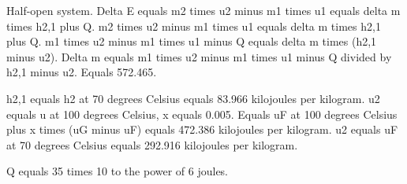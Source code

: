 Half-open system.  
Delta E equals m2 times u2 minus m1 times u1 equals delta m times h2,1 plus Q.  
m2 times u2 minus m1 times u1 equals delta m times h2,1 plus Q.  
m1 times u2 minus m1 times u1 minus Q equals delta m times (h2,1 minus u2).  
Delta m equals m1 times u2 minus m1 times u1 minus Q divided by h2,1 minus u2.  
Equals 572.465.  

h2,1 equals h2 at 70 degrees Celsius equals 83.966 kilojoules per kilogram.  
u2 equals u at 100 degrees Celsius, x equals 0.005.  
Equals uF at 100 degrees Celsius plus x times (uG minus uF) equals 472.386 kilojoules per kilogram.  
u2 equals uF at 70 degrees Celsius equals 292.916 kilojoules per kilogram.  

Q equals 35 times 10 to the power of 6 joules.